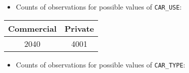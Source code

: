 \documentclass[]{article}
\providecommand{\tightlist}{%
  \setlength{\itemsep}{0pt}\setlength{\parskip}{0pt}}
\begin{document}
\begin{itemize}
\tightlist
\item
  Counts of observations for possible values of \texttt{CAR\_USE}:
\end{itemize}

\begin{longtable}[]{@{}cc@{}}
\toprule
\begin{minipage}[b]{0.17\columnwidth}\centering\strut
Commercial\strut
\end{minipage} & \begin{minipage}[b]{0.12\columnwidth}\centering\strut
Private\strut
\end{minipage}\tabularnewline
\midrule
\endhead
\begin{minipage}[t]{0.17\columnwidth}\centering\strut
2040\strut
\end{minipage} & \begin{minipage}[t]{0.12\columnwidth}\centering\strut
4001\strut
\end{minipage}\tabularnewline
\bottomrule
\end{longtable}

\begin{itemize}
\tightlist
\item
  Counts of observations for possible values of \texttt{CAR\_TYPE}:
\end{itemize}
\end{document}

